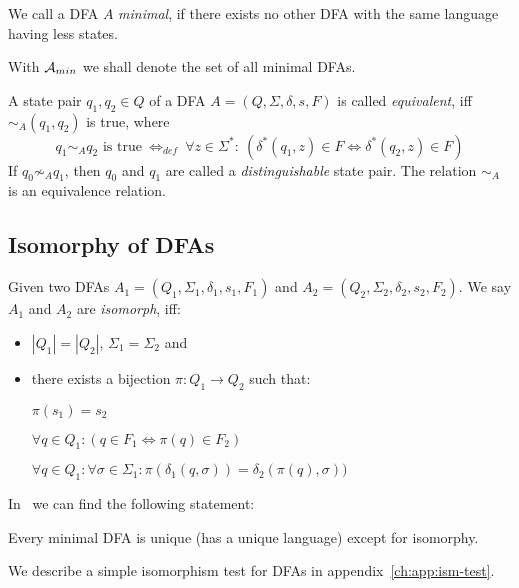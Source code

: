 \begin{definition}
	We call a DFA $A$ \emph{minimal}, if there exists no other DFA with the same language having less states.
\end{definition}
\noindent With ${\mathcal{A}_{min}}$ we shall denote the set of all minimal DFAs.

\begin{definition}\cite[p. 154]{HMU01}\label{ch:2:def:eq-dist-pairs}
	A state pair $q_1, q_2 \in Q$ of a DFA $A = (Q, \Sigma, \delta, s, F)$ is called \emph{equivalent}, iff $\sim_A(q_1, q_2)$ is true, where
	\begin{displaymath}
	q_1 \sim_A q_2 \text{ is true}\ \Leftrightarrow_{def}\ \forall z \in \Sigma^* \colon\ (\delta^*(q_1, z) \in F \Leftrightarrow \delta^*(q_2, z) \in F)
	\end{displaymath}
	If $q_0 \not\sim_A q_1$, then $q_0$ and $q_1$ are called a \emph{distinguishable} state pair. The relation $\sim_A$ is an equivalence relation. 
\end{definition}

\subsection{Isomorphy of DFAs}\label{ch:2:sec:isom}

Given two DFAs $A_1 = (Q_1, \Sigma_1, \delta_1, s_1, F_1)$ and $A_2 = (Q_2, \Sigma_2, \delta_2, s_2, F_2)$. We say $A_1$ and $A_2$ are \emph{isomorph}, iff:
\begin{itemize}
	\item $|Q_1| = |Q_2|$, $\Sigma_1 = \Sigma_2$ and
	\item there exists a bijection $\pi\colon Q_1 \to Q_2$ such that:
	
	$\pi(s_1) = s_2$
	
	$\forall q\in Q_1\colon (q\in F_1 \Longleftrightarrow \pi(q)\in F_2)$
	
	$\forall q\in Q_1\colon \forall\sigma\in\Sigma_1\colon \pi(\delta_1(q,\sigma))=\delta_2(\pi(q),\sigma))$
\end{itemize}
In~\cite[p. 45]{Sch01} we can find the following statement:
\begin{theorem}\label{ch:2:thm:uniq-ism}
	Every minimal DFA is unique (has a unique language) except for isomorphy.
\end{theorem}
\noindent We describe a simple isomorphism test for DFAs in appendix~\ref{ch:app:ism-test}.

